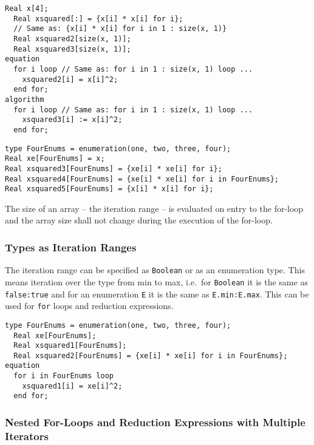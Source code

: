 \begin{example}
\begin{lstlisting}[language=modelica]
  Real x[4];
  Real xsquared[:] = {x[i] * x[i] for i};
  // Same as: {x[i] * x[i] for i in 1 : size(x, 1)}
  Real xsquared2[size(x, 1)];
  Real xsquared3[size(x, 1)];
equation
  for i loop // Same as: for i in 1 : size(x, 1) loop ...
    xsquared2[i] = x[i]^2;
  end for;
algorithm
  for i loop // Same as: for i in 1 : size(x, 1) loop ...
    xsquared3[i] := x[i]^2;
  end for;
\end{lstlisting}

\begin{lstlisting}[language=modelica]
type FourEnums = enumeration(one, two, three, four);
Real xe[FourEnums] = x;
Real xsquared3[FourEnums] = {xe[i] * xe[i] for i};
Real xsquared4[FourEnums] = {xe[i] * xe[i] for i in FourEnums};
Real xsquared5[FourEnums] = {x[i] * x[i] for i};
\end{lstlisting}
\end{example}

The size of an array -- the iteration range -- is evaluated on entry to the for-loop and the array size shall not change during the execution of the for-loop.

\subsubsection{Types as Iteration Ranges}\label{types-as-iteration-ranges}

The iteration range can be specified as \lstinline!Boolean! or as an enumeration type.  This means iteration over the type from min to max, i.e.\ for \lstinline!Boolean! it is the same as \lstinline!false:true! and for an enumeration \lstinline!E! it is the same as \lstinline!E.min:E.max!. This can be used for \lstinline!for! loops and reduction expressions.

\begin{example}
\begin{lstlisting}[language=modelica]
  type FourEnums = enumeration(one, two, three, four);
  Real xe[FourEnums];
  Real xsquared1[FourEnums];
  Real xsquared2[FourEnums] = {xe[i] * xe[i] for i in FourEnums};
equation
  for i in FourEnums loop
    xsquared1[i] = xe[i]^2;
  end for;
\end{lstlisting}
\end{example}

\subsubsection{Nested For-Loops and Reduction Expressions with Multiple Iterators}\label{nested-for-loops-and-reduction-expressions-with-multiple-iterators}


